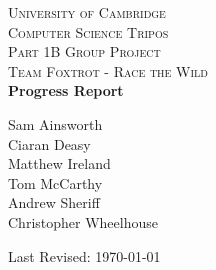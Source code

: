 \begin{titlepage}
\begin{center}


\textsc{\LARGE University of Cambridge}\\[3.5cm]

\textsc{\Large Computer Science Tripos \\[2mm] Part 1B Group Project}\\[0.4cm]
\textsc{\Large Team Foxtrot - Race the Wild}\\[2cm]


{ \huge \bfseries \vspace{3.5mm} Progress Report }\\[2cm]


\begin{center}
\large
Sam Ainsworth\\
Ciaran Deasy\\
Matthew Ireland\\
Tom McCarthy\\
Andrew Sheriff\\
Christopher Wheelhouse\\
\end{center}

\vfill

{\large Last Revised: \today}
\end{center}
\end{titlepage}
